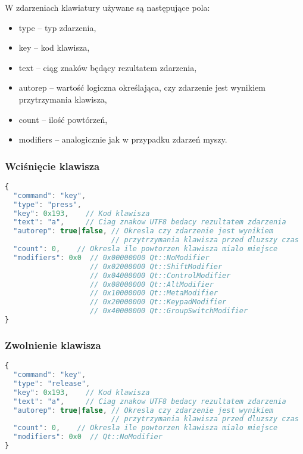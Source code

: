 W zdarzeniach klawiatury używane są następujące pola:
\begin{itemize}
\item type -- typ zdarzenia,
\item key -- kod klawisza,
\item text -- ciąg znaków będący rezultatem zdarzenia,
\item autorep -- wartość logiczna określająca, czy zdarzenie jest wynikiem przytrzymania klawisza,
\item count -- ilość powtórzeń,
\item modifiers -- analogicznie jak w przypadku zdarzeń myszy.
\end{itemize}

\subsubsection{Wciśnięcie klawisza}
\begin{lstlisting}[language=JavaScript,numbers=none]
{
  "command": "key",
  "type": "press", 
  "key": 0x193,    // Kod klawisza
  "text": "a",     // Ciag znakow UTF8 bedacy rezultatem zdarzenia
  "autorep": true|false, // Okresla czy zdarzenie jest wynikiem
                         // przytrzymania klawisza przed dluzszy czas
  "count": 0,    // Okresla ile powtorzen klawisza mialo miejsce
  "modifiers": 0x0  // 0x00000000 Qt::NoModifier
                    // 0x02000000 Qt::ShiftModifier
                    // 0x04000000 Qt::ControlModifier
                    // 0x08000000 Qt::AltModifier
                    // 0x10000000 Qt::MetaModifier
                    // 0x20000000 Qt::KeypadModifier
                    // 0x40000000 Qt::GroupSwitchModifier
}
\end{lstlisting}

\subsubsection{Zwolnienie klawisza}
\begin{lstlisting}[language=JavaScript,numbers=none]
{
  "command": "key",
  "type": "release", 
  "key": 0x193,    // Kod klawisza
  "text": "a",     // Ciag znakow UTF8 bedacy rezultatem zdarzenia
  "autorep": true|false, // Okresla czy zdarzenie jest wynikiem
                         // przytrzymania klawisza przed dluzszy czas
  "count": 0,    // Okresla ile powtorzen klawisza mialo miejsce
  "modifiers": 0x0  // Qt::NoModifier
}
\end{lstlisting}
 